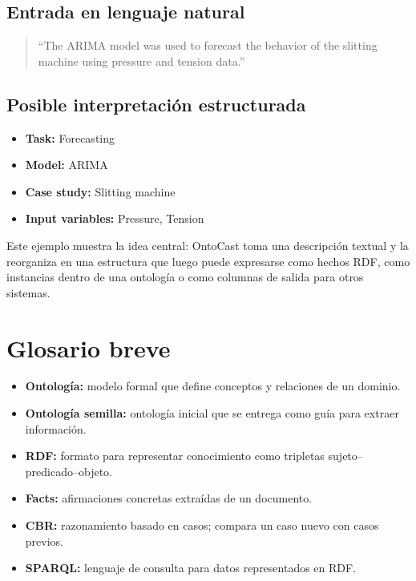 \documentclass[12pt]{article}
\begin{document}
\subsection*{Entrada en lenguaje natural}

\begin{quote}
``The ARIMA model was used to forecast the behavior of the slitting machine using pressure and tension data.''
\end{quote}

\subsection*{Posible interpretación estructurada}

\begin{itemize}
  \item \textbf{Task:} Forecasting
  \item \textbf{Model:} ARIMA
  \item \textbf{Case study:} Slitting machine
  \item \textbf{Input variables:} Pressure, Tension
\end{itemize}

Este ejemplo muestra la idea central: OntoCast toma una descripción textual y la reorganiza en una estructura que luego puede expresarse como hechos RDF, como instancias dentro de una ontología o como columnas de salida para otros sistemas.

\section{Glosario breve}

\begin{itemize}
  \item \textbf{Ontología:} modelo formal que define conceptos y relaciones de un dominio.
  \item \textbf{Ontología semilla:} ontología inicial que se entrega como guía para extraer información.
  \item \textbf{RDF:} formato para representar conocimiento como tripletas sujeto--predicado--objeto.
  \item \textbf{Facts:} afirmaciones concretas extraídas de un documento.
  \item \textbf{CBR:} razonamiento basado en casos; compara un caso nuevo con casos previos.
  \item \textbf{SPARQL:} lenguaje de consulta para datos representados en RDF.
\end{itemize}
\end{document}
